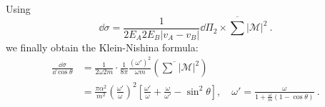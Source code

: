 Using 
\[
\dd\sigma =\frac{1}{2E_A 2E_B|v_A-v_B|}\dd \Pi_2 \times \overline{\sum}|\mathcal M|^2~.
\]
we finally obtain the Klein-Nishina formula:
\begin{equation}\begin{aligned}
\frac{\dd \sigma}{\dd \cos\theta} &= \frac{1}{2\omega 2m}\cdot \frac{1}{8\pi} \frac{(\omega')^2}{\omega m }
\left(\overline{\sum}|\mathcal M|^2\right)\\
&=\frac{\pi \alpha^2}{m^2}\left(\frac{\omega'}{\omega}\right)^2\left[\frac{\omega'}{\omega}+\frac{\omega}{\omega'}-\sin^2\theta\right],\quad \omega'=\frac{\omega}{1+\frac{\omega}{m}(1-\cos\theta)}~.
\end{aligned}\end{equation}
